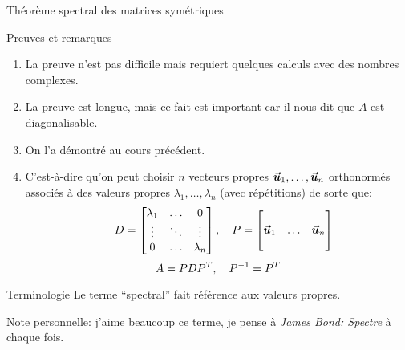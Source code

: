\documentclass[a4paper]{article}
\begin{document}
\begin{parag}{Théorème spectral des matrices symétriques}
    \begin{subparag}{Preuves et remarques}
        \begin{enumerate}[left=0pt]
            \item La preuve n'est pas difficile mais requiert quelques calculs avec des nombres complexes.
            \item La preuve est longue, mais ce fait est important car il nous dit que $A$ est diagonalisable.
            \item On l'a démontré au cours précédent.
            \item C'est-à-dire qu'on peut choisir $n$ vecteurs propres $\bm{\protect\vec{u}}_1, \ldots, \bm{\protect\vec{u}}_n$ orthonormés associés à des valeurs propres $\lambda_1, \ldots, \lambda_n$ (avec répétitions) de sorte que:
            \[\quad D = \begin{bmatrix} \lambda_1 & \ldots & 0 \\ \vdots & \ddots & \vdots \\ 0 & \ldots & \lambda_n \end{bmatrix}, \quad P = \begin{bmatrix}  &  &  \\ \bm{\protect\vec{u}}_1 & \ldots & \bm{\protect\vec{u}}_n \\  &  &  \end{bmatrix}\]
            \[A = PDP^T, \quad P^{-1} = P^T\]
        \end{enumerate}
    \end{subparag}

    \begin{subparag}{Terminologie}
        Le terme ``spectral'' fait référence aux valeurs propres.

        Note personnelle: j'aime beaucoup ce terme, je pense à \textit{James Bond: Spectre} à chaque fois.
    \end{subparag}

\end{parag}
\end{document}
